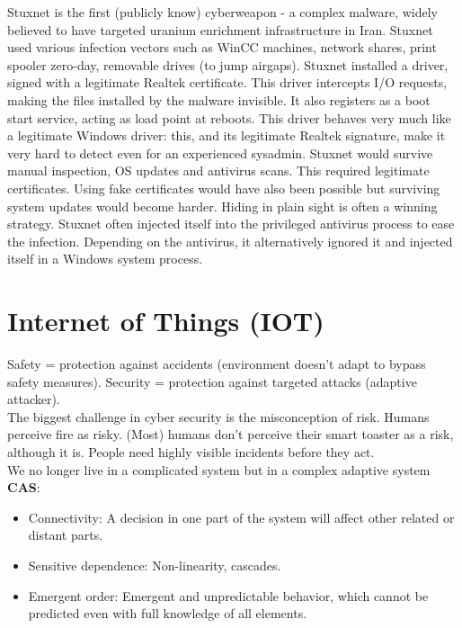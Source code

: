 \documentclass[11pt,oneside,a4paper]{article}
\begin{document}
Stuxnet is the first (publicly know) cyberweapon - a complex malware, widely believed to have targeted uranium enrichment infrastructure in Iran. Stuxnet used various infection vectors such as WinCC machines, network shares, print spooler zero-day, removable drives (to jump airgaps). Stuxnet installed a driver, signed with a legitimate Realtek certificate. This driver intercepts I/O requests, making the files installed by the malware invisible. It also registers as a boot start service, acting as load point at reboots. This driver behaves very much like a legitimate Windows driver: this, and its legitimate Realtek signature, make it very hard to detect even for an experienced sysadmin. Stuxnet would survive manual inspection, OS updates and antivirus scans. This required legitimate certificates. Using fake certificates would have also been possible but surviving system updates would become harder. Hiding in plain sight is often a winning strategy. Stuxnet often injected itself into the privileged antivirus process to ease the infection. Depending on the antivirus, it alternatively ignored it and injected itself in a Windows system process. 

\section{Internet of Things (IOT)}

\label{iot}

Safety = protection against accidents (environment doesn't adapt to bypass safety measures). Security = protection against targeted attacks (adaptive attacker).\\

The biggest challenge in cyber security is the misconception of risk. Humans perceive fire as risky. (Most) humans don't perceive their smart toaster as a risk, although it is. People need highly visible incidents before they act.\\
We no longer live in a complicated system but in a complex adaptive system \textbf{CAS}:

\vspace{-\topsep}
\begin{itemize}
	\setlength{\itemsep}{0pt}
	\setlength{\parskip}{0pt}
	\item Connectivity: A decision in one part of the system will affect other related or distant parts.
	\item Sensitive dependence: Non-linearity, cascades.
	\item Emergent order: Emergent and unpredictable behavior, which cannot be predicted even with full knowledge of all elements.
\end{itemize}
\vspace{-\topsep}
\end{document}
